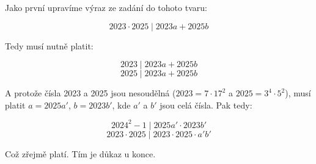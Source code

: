 \documentclass{fkssolpub}
\author{Ondřej Sedláček}
\begin{document}
Jako první upravíme výraz ze zadání do tohoto tvaru:

\[
	2023 \cdot 2025 \mid 2023a + 2025b
\]

Tedy musí nutně platit:

\[
	2023 \mid 2023a + 2025b
\]
\[
	2025 \mid 2023a + 2025b
\]

A protože čísla 2023 a 2025 jsou nesoudělná ($2023 = 7 \cdot 17^2$ a
$2025 = 3^4 \cdot 5^2$), musí platit $a = 2025 a'$, $b = 2023 b'$, kde
$a'$ a $b'$ jsou celá čísla. Pak tedy:

\[
	2024^2 - 1 \mid 2025 a' \cdot 2023 b'
\]
\[
	2023 \cdot 2025 \mid 2023 \cdot 2025 \cdot a'b'
\]

Což zřejmě platí. Tím je důkaz u konce.
\end{document}

